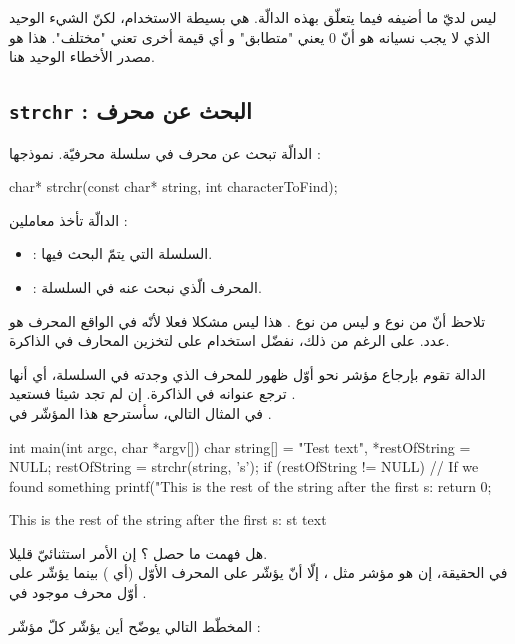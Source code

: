 ليس لديّ ما أضيفه فيما يتعلّق بهذه الدالّة. هي بسيطة الاستخدام، لكنّ الشيء الوحيد الذي لا يجب نسيانه هو أنّ 0 يعني "متطابق" و أي قيمة أخرى تعني "مختلف". هذا هو مصدر الأخطاء الوحيد هنا.

\subsection{\texttt{strchr} : البحث عن محرف}
الدالّة
تبحث عن محرف في سلسلة محرفيّة. نموذجها :
\begin{Csource}
char* strchr(const char* string, int characterToFind);
\end{Csource}
الدالّة تأخذ معاملين :
\begin{itemize}
  \item {} : السلسلة التي يتمّ البحث فيها.
  \item {} : المحرف الّذي نبحث عنه في السلسلة.
\end{itemize}
\begin{information}
  تلاحظ أنّ
  من نوع
  و ليس من نوع
  .
  هذا ليس مشكلا فعلا لأنّه في الواقع المحرف هو عدد. على الرغم من ذلك، نفضّل استخدام
  على
  لتخزين المحارف في الذاكرة.
\end{information}
الدالة تقوم بإرجاع مؤشر نحو أوّل ظهور للمحرف الذي وجدته في السلسلة، أي أنها ترجع عنوانه في الذاكرة. إن لم تجد شيئا فستعيد
.\\
في المثال التالي، سأسترحع هذا المؤشّر في
.
\begin{Csource}
int main(int argc, char *argv[])
{
	char string[] = "Test text", *restOfString = NULL;
	restOfString = strchr(string, 's');
	if (restOfString != NULL) // If we found something
	{
    		printf("This is the rest of the string after the first s:%
	 }
  return 0;
}
\end{Csource}
\begin{Console}
This is the rest of the string after the first s: st text
\end{Console}
هل فهمت ما حصل ؟ إن الأمر استثنائيّ قليلا.\\
في الحقيقة، إن
هو مؤشر مثل
،
إلّا أنّ
يؤشّر على المحرف الأوّل
(أي )
بينما
يؤشّر على أوّل محرف
موجود في
.

المخطّط التالي يوضّح أين يؤشّر كلّ مؤشّر :

